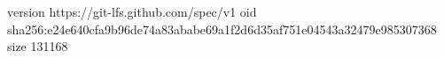 version https://git-lfs.github.com/spec/v1
oid sha256:e24e640cfa9b96de74a83ababe69a1f2d6d35af751e04543a32479e985307368
size 131168
